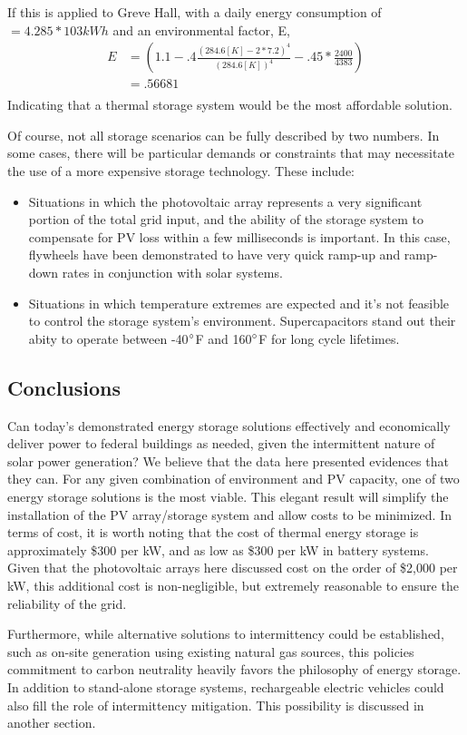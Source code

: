 If this is applied to Greve Hall, with a daily energy consumption of $=4.285*103
kWh$ and an environmental factor, E, 
\begin{equation}
\begin{aligned}
E &=(1.1-.4\frac{(284.6[K]-2*7.2)^4}{(284.6[K])^4}-.45*\frac{2400}{4383})\\
&=.56681\\
\end{aligned}
\end{equation} 
Indicating that a thermal storage system would be the most affordable solution.

Of course, not all storage scenarios can be fully described by two numbers. In
some cases, there will be particular demands or constraints that may
necessitate the use of a more expensive storage technology. These include:
\begin{itemize}
\item Situations in which the photovoltaic array represents a very significant
portion of the total grid input, and the ability of the storage system to
compensate for PV loss within a few milliseconds is important. In this case,
flywheels have been demonstrated to have very quick ramp-up and ramp-down rates
in conjunction with solar systems.
\item Situations in which temperature extremes are expected and it’s not
feasible to control the storage system’s environment. Supercapacitors stand out their abity
to operate between -40$\degree$F and 160$\degree$F for long cycle lifetimes.
\end{itemize}

\subsection{Conclusions}

Can today’s demonstrated energy storage solutions effectively and economically
deliver power to federal buildings as needed, given the intermittent nature of
solar power generation? We believe that the data here presented evidences that
they can. For any given combination of environment and PV capacity, one of two
energy storage solutions is the most viable. This elegant result will simplify
the installation of the PV array/storage system and allow costs to be
minimized. In terms of cost, it is worth noting that the cost of thermal energy
storage is approximately \$300 per kW, and as low as \$300 per kW in battery
systems. Given that the photovoltaic arrays here discussed cost on the order of
\$2,000 per kW, this additional cost is non-negligible, but extremely reasonable
to ensure the reliability of the grid.

Furthermore, while alternative solutions to intermittency could be established,
such as on-site generation using existing natural gas sources, this policies
commitment to carbon neutrality heavily favors the philosophy of energy
storage. In addition to stand-alone storage systems, rechargeable electric
vehicles could also fill the role of intermittency mitigation. This possibility
is discussed in another section.
